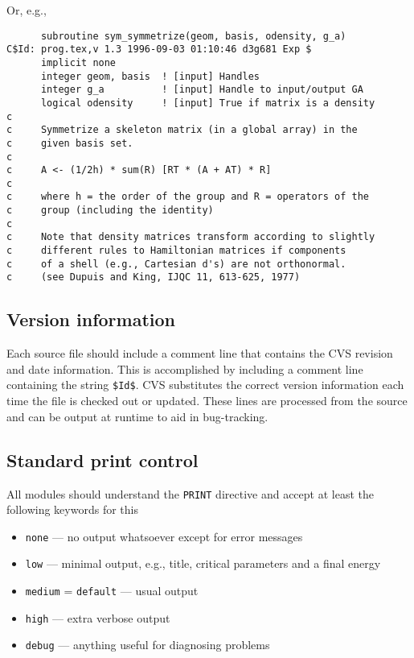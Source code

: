 Or, e.g.,
\begin{verbatim}
      subroutine sym_symmetrize(geom, basis, odensity, g_a)
C$Id: prog.tex,v 1.3 1996-09-03 01:10:46 d3g681 Exp $
      implicit none
      integer geom, basis  ! [input] Handles
      integer g_a          ! [input] Handle to input/output GA
      logical odensity     ! [input] True if matrix is a density
c
c     Symmetrize a skeleton matrix (in a global array) in the
c     given basis set.
c
c     A <- (1/2h) * sum(R) [RT * (A + AT) * R]
c
c     where h = the order of the group and R = operators of the
c     group (including the identity)
c
c     Note that density matrices transform according to slightly
c     different rules to Hamiltonian matrices if components
c     of a shell (e.g., Cartesian d's) are not orthonormal.
c     (see Dupuis and King, IJQC 11, 613-625, 1977)
\end{verbatim}


\subsection{Version information}

Each source file should include a comment line that contains the CVS
revision and date information.  This is accomplished by including a
comment line containing the string \verb+$+\verb+Id+\verb+$+.  CVS
substitutes the correct version information each time the file is
checked out or updated.  These lines are processed from the source and can be
output at runtime to aid in bug-tracking.

\subsection{Standard print control}

All modules should understand the \verb+PRINT+ directive and
accept at least the following keywords for this
\begin{itemize}
\item \verb+none+ --- no output whatsoever except for error messages
\item \verb+low+ --- minimal output, e.g., title, critical parameters
and a final energy
\item \verb+medium+ = \verb+default+ --- usual output
\item \verb+high+ --- extra verbose output
\item \verb+debug+ --- anything useful for diagnosing problems
\end{itemize}


